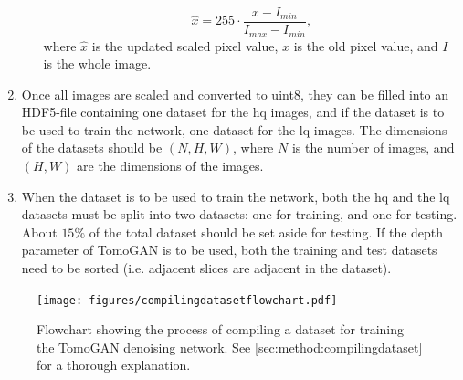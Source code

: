 \begin{enumerate}
\begin{enumerate}
        \begin{equation}
            \label{eq:scaleimages}
            \hat{x} = 255 \cdot \frac{x - I_{min}}{I_{max} - I_{min}},
        \end{equation}
        where $\hat{x}$ is the updated scaled pixel value, $x$ is the old pixel value, and $I$ is the whole image.
    \end{enumerate}
    \item Once all images are scaled and converted to uint8, they can be filled into an HDF5-file containing one dataset for the \gls{hq} images, and if the dataset is to be used to train the network, one dataset for the \gls{lq} images. The dimensions of the datasets should be $(N,H,W)$, where $N$ is the number of images, and $(H,W)$ are the dimensions of the images. 
    \item When the dataset is to be used to train the network, both the \gls{hq} and the \gls{lq} datasets must be split into two datasets: one for training, and one for testing. About $15\%$ of the total dataset should be set aside for testing. If the depth parameter of TomoGAN is to be used, both the training and test datasets need to be sorted (i.e. adjacent slices are adjacent in the dataset). 
\end{enumerate}


\begin{figure}[htbp]  
    \centering
    \texttt{[image: figures/compilingdatasetflowchart.pdf]}
    \caption[Dataset creation flowchart for TomoGAN]{Flowchart showing the process of compiling a dataset for training the TomoGAN denoising network. See \cref{sec:method:compilingdataset} for a thorough explanation. }
    \label{fig:compilingdatasetflowchart}
\end{figure}
